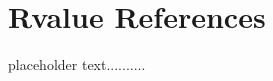 \newpage
\section[Rvalue References]{Rvalue References}\label{Rvalue-References}


placeholder text..........


